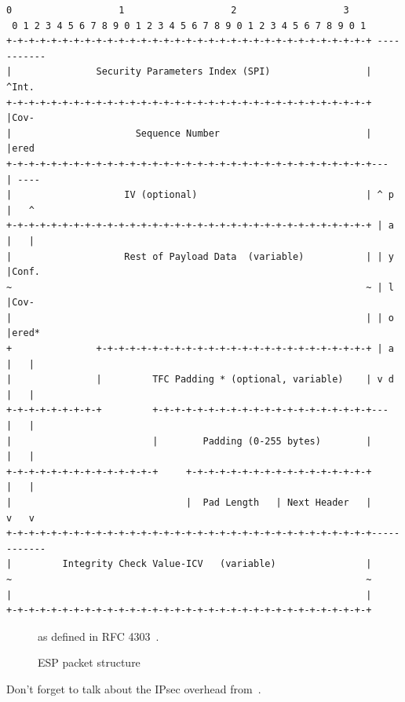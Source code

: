 \begin{lrbox}{\myv}\begin{minipage}{\textwidth}
\begin{verbatim}
0                   1                   2                   3
 0 1 2 3 4 5 6 7 8 9 0 1 2 3 4 5 6 7 8 9 0 1 2 3 4 5 6 7 8 9 0 1
+-+-+-+-+-+-+-+-+-+-+-+-+-+-+-+-+-+-+-+-+-+-+-+-+-+-+-+-+-+-+-+-+ -----------
|               Security Parameters Index (SPI)                 |      ^Int.
+-+-+-+-+-+-+-+-+-+-+-+-+-+-+-+-+-+-+-+-+-+-+-+-+-+-+-+-+-+-+-+-+      |Cov-
|                      Sequence Number                          |      |ered
+-+-+-+-+-+-+-+-+-+-+-+-+-+-+-+-+-+-+-+-+-+-+-+-+-+-+-+-+-+-+-+-+---   | ----
|                    IV (optional)                              | ^ p  |   ^
+-+-+-+-+-+-+-+-+-+-+-+-+-+-+-+-+-+-+-+-+-+-+-+-+-+-+-+-+-+-+-+-+ | a  |   |
|                    Rest of Payload Data  (variable)           | | y  |Conf.
~                                                               ~ | l  |Cov-
|                                                               | | o  |ered*
+               +-+-+-+-+-+-+-+-+-+-+-+-+-+-+-+-+-+-+-+-+-+-+-+-+ | a  |   |
|               |         TFC Padding * (optional, variable)    | v d  |   |
+-+-+-+-+-+-+-+-+         +-+-+-+-+-+-+-+-+-+-+-+-+-+-+-+-+-+-+-+---   |   |
|                         |        Padding (0-255 bytes)        |      |   |
+-+-+-+-+-+-+-+-+-+-+-+-+-+     +-+-+-+-+-+-+-+-+-+-+-+-+-+-+-+-+      |   |
|                               |  Pad Length   | Next Header   |      v   v
+-+-+-+-+-+-+-+-+-+-+-+-+-+-+-+-+-+-+-+-+-+-+-+-+-+-+-+-+-+-+-+-+------------
|         Integrity Check Value-ICV   (variable)                |
~                                                               ~
|                                                               |
+-+-+-+-+-+-+-+-+-+-+-+-+-+-+-+-+-+-+-+-+-+-+-+-+-+-+-+-+-+-+-+-+
\end{verbatim}
\end{minipage}\end{lrbox}

\begin{figure}
\center
	\resizebox{.8\linewidth}{!}{%
	\usebox\myv
	}
\caption{ESP packet structure}{as defined in RFC 4303~\cite{rfc4303}.}
\label{fig:esp-packet-structure}
\end{figure}


Don't forget to talk about the IPsec overhead from~\cite{Xenakis20063225}.